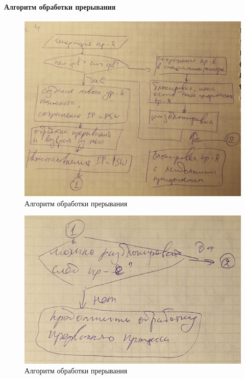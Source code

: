 \paragraph{Алгоритм обработки прерывания}

\begin{figure}[H]
    \centering
    \includegraphics[width=\textwidth]{pic/4.png}
    \caption{Алгоритм обработки прерывания}
\end{figure}

\begin{figure}[H]
    \centering
    \includegraphics[width=\textwidth]{pic/5.png}
    \caption{Алгоритм обработки прерывания}
\end{figure}

